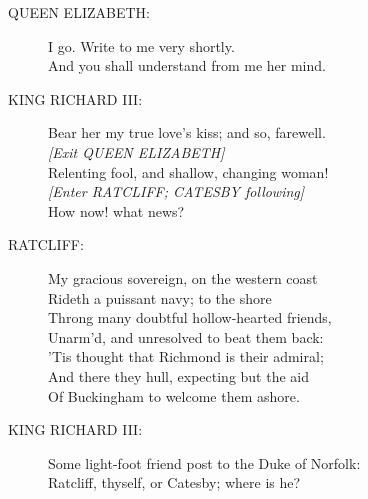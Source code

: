 \documentclass{article}
\begin{document}
\begin{description}
\item[QUEEN ELIZABETH:] 
\hspace{1pt}I go. Write to me very shortly.\\
\hspace{1pt}And you shall understand from me her mind.\\
\end{description}
\begin{description}
\item[KING RICHARD III:] 
\hspace{1pt}Bear her my true love's kiss; and so, farewell.\\
{\it [Exit QUEEN ELIZABETH]}\\
\hspace{1pt}Relenting fool, and shallow, changing woman!\\
{\it [Enter RATCLIFF; CATESBY following]}\\
\hspace{1pt}How now! what news?\\
\end{description}
\begin{description}
\item[RATCLIFF:] 
\hspace{1pt}My gracious sovereign, on the western coast\\
\hspace{1pt}Rideth a puissant navy; to the shore\\
\hspace{1pt}Throng many doubtful hollow-hearted friends,\\
\hspace{1pt}Unarm'd, and unresolved to beat them back:\\
\hspace{1pt}'Tis thought that Richmond is their admiral;\\
\hspace{1pt}And there they hull, expecting but the aid\\
\hspace{1pt}Of Buckingham to welcome them ashore.\\
\end{description}
\begin{description}
\item[KING RICHARD III:] 
\hspace{1pt}Some light-foot friend post to the Duke of Norfolk:\\
\hspace{1pt}Ratcliff, thyself, or Catesby; where is he?\\
\end{description}
\end{document}
